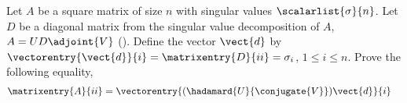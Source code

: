 Let $A$ be a square matrix of size $n$ with singular values $\scalarlist{\sigma}{n}$. Let $D$ be a diagonal matrix from the singular value decomposition of $A$, $A = UD \adjoint{V}$ ().  Define the vector $\vect{d}$ by $\vectorentry{\vect{d}}{i}=\matrixentry{D}{ii}=\sigma_i$, $1\leq i\leq n$. Prove the following equality,
%
\begin{align*}
\matrixentry{A}{ii}
&=
\vectorentry{(\hadamard{U}{\conjugate{V}})\vect{d}}{i}
\end{align*}
